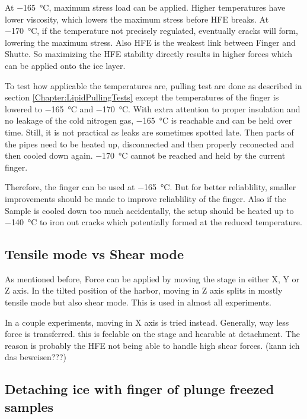 At \SI{-165}{\degreeCelsius}, maximum stress load can be applied. Higher temperatures have lower viscosity, which lowers the maximum stress before HFE breaks. At \SI{-170}{\degreeCelsius}, if the temperature not precisely regulated, eventually cracks will form, lowering the maximum stress. Also HFE is the weakest link between Finger and Shutte. So maximizing the HFE stability directly results in higher forces which can be applied onto the ice layer.

To test how applicable the temperatures are, pulling test are done as described in section \ref{Chapter:LipidPullingTests} except the temperatures of the finger is lowered to \SI{-165}{\degreeCelsius} and \SI{-170}{\degreeCelsius}. With extra attention to proper insulation and no leakage of the cold nitrogen gas, \SI{-165}{\degreeCelsius} is reachable and can be held over time. Still, it is not practical as leaks are sometimes spotted late. Then parts of the pipes need to be heated up, disconnected and then properly reconected and then cooled down again. \SI{-170}{\degreeCelsius} cannot be reached and held by the current finger. 

Therefore, the finger can be used at \SI{-165}{\degreeCelsius}. But for better reliablility, smaller improvements should be made to improve reliablility of the finger. Also if the Sample is cooled down too much accidentally, the setup should be heated up to \SI{-140}{\degreeCelsius} to iron out cracks which potentially formed at the reduced temperature.

\subsection{Tensile mode vs Shear mode}

As mentioned before, Force can be applied by moving the stage in either X, Y or Z axis. In the tilted position of the harbor, moving in Z axis splits in mostly tensile mode but also shear mode. This is used in almost all experiments.

In a couple experiments, moving in X axis is tried instead. Generally, way less force is transferred. this is feelable on the stage and hearable at detachment. The reason is probably the HFE not being able to handle high shear forces. (kann ich das beweisen???)

\subsection{Detaching ice with finger of plunge freezed samples}

